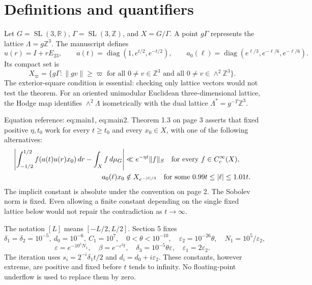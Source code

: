 \documentclass[10pt]{article}
\begin{document}
\section*{Definitions and quantifiers}
Let \(G=\operatorname{SL}(3,\mathbb R)\), \(\Gamma=\operatorname{SL}(3,\mathbb Z)\), and \(X=G/\Gamma\). A point \(g\Gamma\) represents the lattice \(\Lambda=g\mathbb Z^3\). The manuscript defines \[u(r)=I+rE_{23},\qquad
 a(t)=\operatorname{diag}(1,e^{t/2},e^{-t/2}),\qquad
 a_0(\ell)=\operatorname{diag}(e^{\ell/3},e^{-\ell/6},e^{-\ell/6}).\] Its compact set is \[X_\varpi=\{g\Gamma:\|gv\|\geq\varpi
 \text{ for all }0\ne v\in\mathbb Z^3\text{ and all }0\ne v\in\wedge^2\mathbb Z^3\}.\] The exterior-square condition is essential: checking only lattice vectors would not test the theorem. For an oriented unimodular Euclidean three-dimensional lattice, the Hodge map identifies \(\wedge^2\Lambda\) isometrically with the dual lattice \(\Lambda^*=g^{-T}\mathbb Z^3\).\par
Equation reference: eq:main1, eq:main2. Theorem 1.3 on page 3 asserts that fixed positive \(\eta,t_0\) work for every \(t\geq t_0\) and every \(x_0\in X\), with one of the following alternatives: \[\begin{aligned}
 \left|\int_{-1/2}^{1/2}f(a(t)u(r)x_0)\,dr-\int_Xf\,d\mu_G\right|
 &\ll e^{-\eta t}\|f\|_S\quad\hbox{for every }f\in C_c^\infty(X),\\
 a_0(\ell)x_0&\notin X_{e^{-|\ell|/3}}
 \quad\hbox{for some }0.99t\leq|\ell|\leq1.01t.\end{aligned}\] The implicit constant is absolute under the convention on page 2. The Sobolev norm is fixed. Even allowing a finite constant depending on the single fixed lattice below would not repair the contradiction as \(t\to\infty\).\par
The notation \([L]\) means \([-L/2,L/2]\). Section 5 fixes \[\delta_1=\delta_2=10^{-5},\ d_0=10^{-6},\ C_1=10^7,\quad
 0<\theta<10^{-10},\quad \varepsilon_2=10^{-26}\theta,\quad N_1=10^5/\varepsilon_2,\] \[\varepsilon=e^{-10^5N_1},\quad\beta=e^{-\varepsilon^3t},\quad
 \delta_3=10^{-5}\theta\varepsilon,\quad \varepsilon_1=2\varepsilon_2.\] The iteration uses \(s_i=2^{-i}\delta_1t/2\) and \(d_i=d_0+i\varepsilon_2\). These constants, however extreme, are positive and fixed before \(t\) tends to infinity. No floating-point underflow is used to replace them by zero.\par
\end{document}
